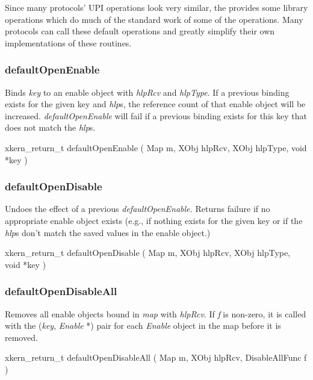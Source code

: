 Since many protocols' UPI operations look very similar, the \xk{}
provides some library operations which do much of the standard work of
some of the operations.  Many protocols can call these default
operations and greatly simplify their own implementations of these
routines.  


\subsubsection{defaultOpenEnable}

Binds {\em key} to an enable object with {\em hlpRcv} and {\em
hlpType}.  If a previous binding exists for the given key and {\em hlp}s,
the reference count of that enable object will be increased.  
{\em defaultOpenEnable} will fail if a previous binding exists for
this key that does not match the {\em hlp}s.

\medskip

{\sem xkern\_return\_t} {\bold defaultOpenEnable} 
( 
{\sem Map} {\caps m}, 
{\sem XObj} {\caps hlpRcv}, 
{\sem XObj} {\caps hlpType}, 
{\sem void} *{\caps key}
)


\subsubsection{defaultOpenDisable}

Undoes the effect of a previous {\em defaultOpenEnable.}
Returns failure if no appropriate enable object exists (e.g., if
nothing exists for the given key or if the {\em hlp}s don't match the
saved values in the enable object.)

\medskip

{\sem xkern\_return\_t} {\bold defaultOpenDisable} 
( 
{\sem Map} {\caps m}, 
{\sem XObj} {\caps hlpRcv}, 
{\sem XObj} {\caps hlpType}, 
{\sem void} *{\caps key}
)


\subsubsection{defaultOpenDisableAll}

Removes all enable objects bound in {\em map} with {\em hlpRcv}.
If {\em f} is non-zero, it is called with the ({\em key}, {\em
Enable} *) pair for each {\em Enable} object in the map before it is removed.


\medskip

{\sem xkern\_return\_t} {\bold defaultOpenDisableAll} 
( 
{\sem Map} {\caps m}, 
{\sem XObj} {\caps hlpRcv}, 
{\sem DisableAllFunc} {\caps f}
)

